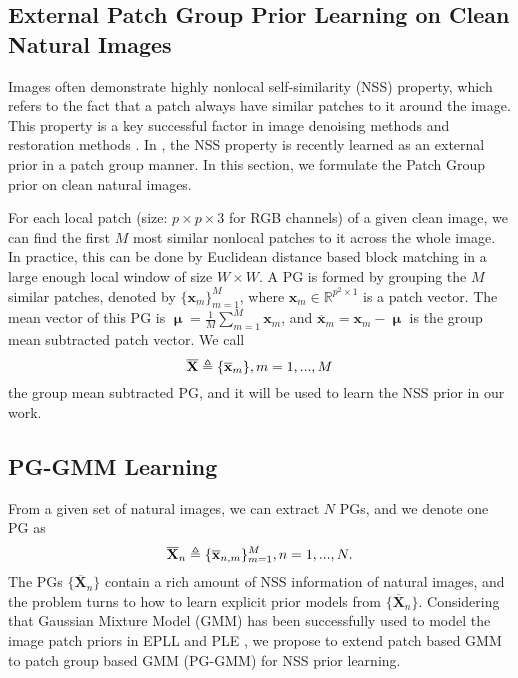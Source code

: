 \documentclass[10pt,twocolumn,letterpaper]{article}
\begin{document}
\subsection{External Patch Group Prior Learning on Clean Natural Images}
Images often demonstrate highly nonlocal self-similarity (NSS) property, which refers to the fact that a patch always have similar patches to it around the image. This property is a key successful factor in image denoising methods \cite{nlm,bm3d,lssc,ncsr,wnnm} and restoration methods \cite{}. In \cite{pgpd}, the NSS property is recently learned as an external prior in a patch group manner. In this section, we formulate the Patch Group prior on clean natural images.

For each local patch (size: $p\times p \times 3$ for RGB channels) of a given clean image, we can find the first $M$ most similar nonlocal patches to it across the whole image. In practice, this can be done by Euclidean distance based block matching in a large enough local window of size $W\times W$. A PG is formed by grouping the $M$ similar patches, denoted by $\{\mathbf{x}_{m}\}_{m=1}^{M}$, where $\mathbf{x}_{m}\in \mathbb{R}^{p^{2}\times1}$ is a patch vector. The mean vector of this PG is $\boldsymbol{\upmu}=\frac{1}{M}\sum_{m=1}^{M}\mathbf{x}_{m}$, and $\mathbf{\overline{x}}_{m}=\mathbf{x}_{m}-\boldsymbol{\upmu}$ is the group mean subtracted patch vector. We call
\begin{equation}\label{equ1}
\setlength{\abovedisplayskip}{2pt}
\setlength{\belowdisplayskip}{2pt}
\mathbf{\overline{X}}\triangleq \{\mathbf{\overline{x}}_{m}\}, m=1,...,M
\end{equation}
the group mean subtracted PG, and it will be used to learn the NSS prior in our work. 
 
\subsection{PG-GMM Learning}
From a given set of natural images, we can extract $N$ PGs, and we denote one PG as
\begin{equation}\label{equ2}
\setlength{\abovedisplayskip}{2pt}
\setlength{\belowdisplayskip}{2pt}
\mathbf{\overline{X}}_{n}\triangleq \{\mathbf{\overline{x}}_{n,m}\}_{m=1}^{M}, n=1,...,N.
\end{equation}
The PGs $\{\mathbf{\overline{X}}_{n}\}$ contain a rich amount of NSS information of natural images, and the problem turns to how to learn explicit prior models from $\{\mathbf{\overline{X}}_{n}\}$. Considering that Gaussian Mixture Model (GMM) has been successfully used to model the image patch priors in EPLL \cite{epll} and PLE \cite{ple}, we propose to extend patch based GMM to patch group based GMM (PG-GMM) for NSS prior learning.
\end{document}
